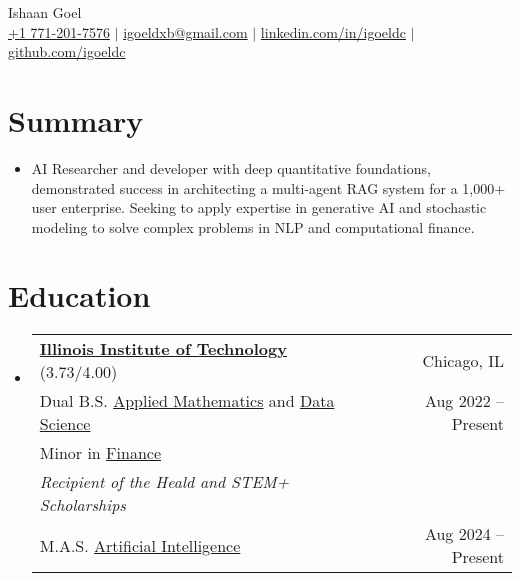 \documentclass[letterpaper,10pt]{article}
\newcommand\indentsize{10pt}
\newcommand{\resumeSubHeadingListStart}{\begin{itemize}[leftmargin=0.15in, label=]}
\newcommand{\resumeSubHeadingListEnd}{\end{itemize}}
\begin{document}
\begin{center}
    \Huge Ishaan Goel \\ \vspace{2pt}
    \large
    \href{tel:17712017576}{+1 771-201-7576}
    $|$ \href{mailto:igoeldxb@gmail.com}{igoeldxb@gmail.com}
    $|$ \href{https://linkedin.com/in/igoeldc/}{linkedin.com/in/igoeldc}
    $|$ \href{https://github.com/igoeldc}{github.com/igoeldc}
\end{center}

\section{Summary}
  \resumeSubHeadingListStart
    \item{AI Researcher and developer with deep quantitative foundations, demonstrated success in architecting a multi-agent RAG system for a 1,000+ user enterprise. Seeking to apply expertise in generative AI and stochastic modeling to solve complex problems in NLP and computational finance.}
  \resumeSubHeadingListEnd
\vspace{-10pt}

\newcommand{\resumeEducationHeading}[9]{
  \item
    \begin{tabular*}{0.97\textwidth}[t]{l@{\extracolsep{\fill}}r}
      \textbf{#1} {#2} & #3 \\
      \hspace{\indentsize} #4 & #5 \\
      \hspace{20pt} #6 & \\
      \hspace{20pt} \textit{#7} & \\
      \hspace{\indentsize} #8 & #9
    \end{tabular*}
}

\section{Education}
  \resumeSubHeadingListStart
    \resumeEducationHeading
      {\href{https://www.iit.edu/}{Illinois Institute of Technology}}{(3.73/4.00)}{Chicago, IL}{Dual B.S. \href{https://catalog.iit.edu/undergraduate/colleges/computing/applied-mathematics/bs/\#text}{Applied Mathematics} and \href{https://catalog.iit.edu/undergraduate/colleges/computing/computer-science/\#:~:text=The\%20B.S.\%20in\%20Data,be\%20successful\%20data\%20science\%20professionals.}{Data Science}}{Aug 2022 -- Present}{Minor in \href{https://catalog.iit.edu/undergraduate/colleges/business/minor-finance/\#:~:text=business\%20schools\%20worldwide.-,Required\%20Courses,-Course\%20List}{Finance}}
      {Recipient of the Heald and STEM+ Scholarships}{M.A.S. \href{https://catalog.iit.edu/graduate/colleges/computing/computer-science/master-artificial-intelligence/\#overviewtext}{Artificial Intelligence}}{Aug 2024 -- Present}
  \resumeSubHeadingListEnd
\vspace{-10pt}
\end{document}
